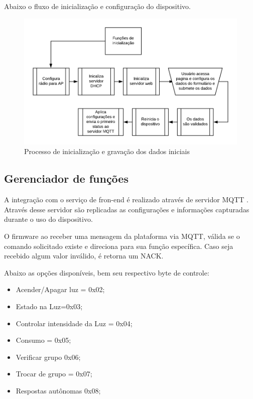 \documentclass[openright]{normas-utf-tex} %
\begin{document}
Abaixo o fluxo de inicialização e configuração do dispositivo.
\begin{figure}[!htb]
     \centering
     \includegraphics[scale=1]{Ini_flux.png}
     \caption{Processo de inicialização e gravação dos dados iniciais}
     \label{}
\end{figure}

\subsection{Gerenciador de funções}

A integração com o serviço de fron-end é realizado através de servidor MQTT \cite{Novatec}. Através desse servidor são replicadas as configurações e informações capturadas durante o uso do dispositivo. 

O firmware ao receber uma mensagem da plataforma via MQTT, válida se o comando solicitado existe e direciona para sua função específica. Caso seja recebido algum valor inválido, é retorna um NACK.

Abaixo as opções disponíveis, bem seu respectivo byte de controle:

\begin{itemize}
    \item Acender/Apagar luz = 0x02;
    \item Estado na Luz=0x03;
    \item Controlar intensidade da Luz = 0x04;
    \item Consumo = 0x05;
    \item Verificar grupo 0x06;
    \item Trocar de grupo = 0x07;
    \item Respostas autônomas 0x08;
\end{itemize}
\end{document}
